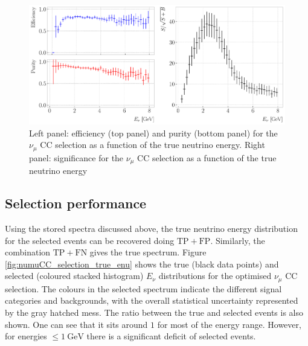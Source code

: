 \begin{figure}[t]
	\centering
	\includegraphics[width=.99\linewidth]{Images/GAr_selection/numuCC_selection_true_energy_performance.pdf}
	\caption[True neutrino energy spectra for the $\nu_{\mu}$ CC selection.]{Left panel: efficiency (top panel) and purity (bottom panel) for the $\nu_{\mu}$ CC selection as a function of the true neutrino energy. Right panel: significance for the $\nu_{\mu}$ CC selection as a function of the true neutrino energy}
	\label{fig:numuCC_selection_true_enu_performance}
\end{figure}

\subsection{Selection performance}

Using the stored spectra discussed above, the true neutrino energy distribution for the selected events can be recovered doing $\mathrm{TP}+\mathrm{FP}$. Similarly, the combination $\mathrm{TP}+\mathrm{FN}$ gives the true spectrum. Figure \ref{fig:numuCC_selection_true_enu} shows the true (black data points) and selected (coloured stacked histogram) $E_{\nu}$ distributions for the optimised $\nu_{\mu}$ CC selection. The colours in the selected spectrum indicate the different signal categories and backgrounds, with the overall statistical uncertainty represented by the gray hatched mess. The ratio between the true and selected events is also shown. One can see that it sits around $1$ for most of the energy range. However, for energies $\leq 1~\mathrm{GeV}$ there is a significant deficit of selected events.

